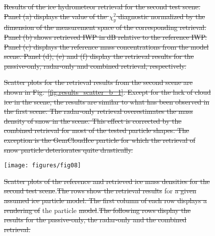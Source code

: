 \documentclass[journal abbreviation, manuscript]{copernicus}
\providecommand{\DIFadd}[1]{{\protect\color{blue}\uwave{#1}}} %
\providecommand{\DIFdel}[1]{{\protect\color{red}\sout{#1}}}                      %
\providecommand{\DIFaddFL}[1]{\DIFadd{#1}} %
\providecommand{\DIFdelFL}[1]{\DIFdel{#1}} %
\providecommand{\DIFaddbeginFL}{} %
\providecommand{\DIFaddendFL}{} %
\providecommand{\DIFdelbeginFL}{} %
\providecommand{\DIFdelendFL}{} %
\begin{document}
\begin{figure}
\centering
\DIFdelbeginFL %
{%
\DIFdelFL{Results of the ice hydrometeor retrieval for the second test scene.
  Panel (a) displays the value of the $\chi^2_y$ diagnostic normalized by the
  dimension of the measurement space of the corresponding retrieval. Panel (b)
  shows retrieved IWP in dB relative to the reference IWP. Panel (c) displays
  the reference mass concentrations from the model scene. Panel (d), (e) and (f)
  display the retrieval results for the passive-only, radar-only and combined
  retrieval, respectively.}}

\DIFdel{Scatter plots for the retrieval results from the second scene are shown in
Fig.~\ref{fig:results_scatter_b_1}. Except for the lack of cloud ice in the
scene,
the results are similar to what has been observed in the first scene: The
radar-only retrieval overestimates the mass density of snow in the scene. This
effect is corrected by the combined retrieval for most of the tested particle
shapes.
The exception is the GemCloudIce particle for which the retrieval of
snow particle deteriorates quite drastically.
}%

\DIFdelendFL \DIFaddbeginFL \texttt{[image: figures/fig08]}
\DIFaddendFL \caption{\DIFdelbeginFL \DIFdelFL{Scatter plots of the reference and retrieved ice mass densities for
  the second test scene}\DIFdelendFL \DIFaddbeginFL \DIFaddFL{Same as Fig}\DIFaddendFL .\DIFdelbeginFL \DIFdelFL{The rows show the retrieval results }\DIFdelendFL \DIFaddbeginFL \DIFaddFL{~\ref{fig:results_scatter_a_1} but }\DIFaddendFL for \DIFdelbeginFL \DIFdelFL{a given
  assumed ice particle model. The first column of each row displays a rendering
  of }\DIFdelendFL the \DIFaddbeginFL \DIFaddFL{remaining }\DIFaddendFL particle
  \DIFdelbeginFL \DIFdelFL{model}\DIFdelendFL \DIFaddbeginFL \DIFaddFL{shapes}\DIFaddendFL .\DIFdelbeginFL \DIFdelFL{The following rows display the results for the
  passive-only, the radar-only and the combined retrieval.}\DIFdelendFL }
\DIFdelbeginFL %
\DIFdelendFL \DIFaddbeginFL \label{fig:results_scatter_a_2}
\DIFaddendFL \end{figure}
\end{document}
